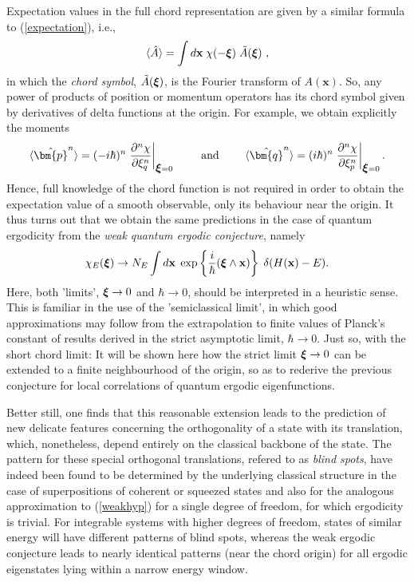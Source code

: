 \documentclass[12pt]{iopart}
\def\p{{\bm{p}}}
\def\q{{\bm{q}}}
\newcommand{\be}{\begin{equation}}
\newcommand{\ee}{\end{equation}}
\newcommand{\x}{{\mathbf x}}
\newcommand{\opA}{{\hat{A}}}
\newcommand{\vct}[1]{\ensuremath\mbox{\boldmath$ #1 $}}
\newcommand{\Vxi}{\vct \xi}
\begin{document}
Expectation values in the full chord representation are given by a similar formula to (\ref{expectation}), i.e.,
\begin{equation}
\langle \opA \rangle = \int d\x \;\chi(-\Vxi)\;\tilde{A}(\Vxi) \ ,
\label{chordexpect}
\end{equation}
in which the {\it chord symbol}, $\tilde{A}(\Vxi)$, is the Fourier transform of $A(\x)$. 
So, any power of products of position or momentum operators has its chord symbol given
by derivatives of delta functions at the origin. For example, we obtain explicitly
the moments
\be
\langle\hat\p^n\rangle=(-i\hbar)^{n}\left.\frac{\partial^n\chi}{\partial\xi_q^n}\right|_{\Vxi=0}
\quad\quad\textrm{ and }\quad\quad
\langle\hat\q^n\rangle=(i\hbar)^{n}\left.\frac{\partial^n\chi}{\partial\xi_p^n}\right|_{\Vxi=0}.
\label{deri-moment}
\ee
Hence, full knowledge of the chord function is not required in order to obtain
the expectation value of a smooth observable, only its behaviour near the origin.
It thus turns out that we obtain the same predictions in the case of quantum ergodicity 
from the {\it weak quantum ergodic conjecture}, namely
\be
\chi_E(\Vxi) \rightarrow N_E \int d\x \; \exp\left\{\frac{i}{\hbar}(\Vxi\wedge \x)\right\} \; \delta(H(\x)-E).
\label{weakhyp}
\ee
Here, both 'limits', $\Vxi\rightarrow 0$ and $\hbar\rightarrow 0$, should be interpreted 
in a heuristic sense. This is familiar in the use of the 'semiclassical limit', in which
good approximations may follow from the extrapolation to finite values of Planck's constant
of results derived in the strict asymptotic limit, $\hbar \rightarrow 0$.
Just so, with the short chord limit: It will be shown here how 
the strict limit $\Vxi \rightarrow 0$ can be extended to a finite neighbourhood of the origin,
so as to rederive the previous conjecture for local correlations of quantum ergodic eigenfunctions.

Better still, one finds that this reasonable extension leads to the prediction of new delicate
features concerning the orthogonality of a state with its translation, which, nonetheless, 
depend entirely on the classical backbone of the state. The pattern for these special orthogonal 
translations, refered to as {\it blind spots}, have indeed been found to be determined by the underlying
classical structure in the case of superpositions of coherent or squeezed states and also for the analogous
approximation to (\ref{weakhyp}) for a single degree of freedom, for which ergodicity is trivial.
For integrable systems with higher degrees of freedom, states of similar energy will have different
patterns of blind spots, whereas the weak ergodic conjecture leads to nearly identical patterns
(near the chord origin) for all ergodic eigenstates lying within a narrow energy window. 
\end{document}
